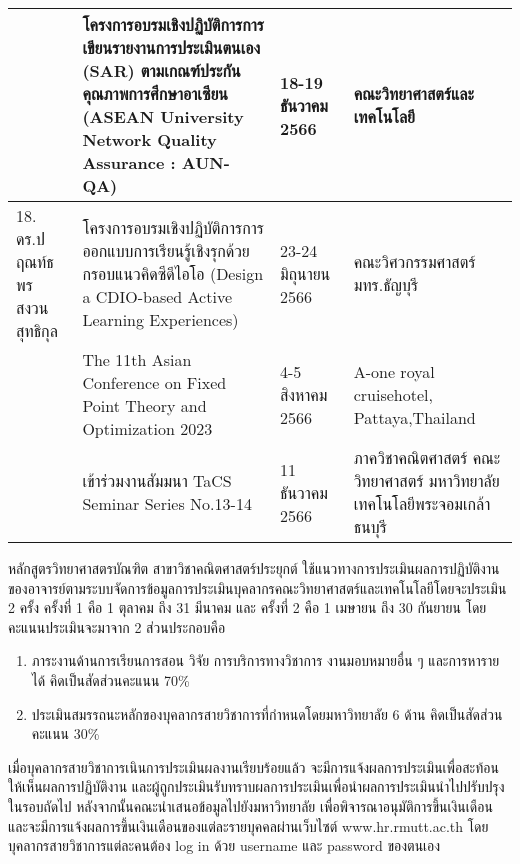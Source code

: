 \begin{longtable}{|p{}|>{\raggedright}p{}|>{\raggedright}p{}|p{}|}
\cline{2-4} 
&โครงการอบรมเชิงปฏิบัติการ\newline การเขียนรายงานการประเมินตนเอง (SAR) ตามเกณฑ์ประกันคุณภาพการศึกษาอาเซียน (ASEAN University Network Quality Assurance : AUN-QA)
&18-19 ธันวาคม 2566
&คณะวิทยาศาสตร์และเทคโนโลยี\\             
\hline
18. ดร.ปฤณท์ธพร สงวนสุทธิกุล
&โครงการอบรมเชิงปฏิบัติการการออกแบบการเรียนรู้เชิงรุกด้วยกรอบแนวคิดซีดีไอโอ (Design a CDIO-based Active Learning Experiences)	
&23-24 มิถุนายน 2566	
&คณะวิศวกรรมศาสตร์ มทร.ธัญบุรี\\
\cline{2-4} 
&The 11th Asian Conference on Fixed Point Theory and Optimization 2023	
&4-5 สิงหาคม 2566	
&A-one royal cruise\newline hotel, Pattaya,\newline Thailand\\             
\cline{2-4} 
&เข้าร่วมงานสัมมนา TaCS Seminar Series No.13-14	
&11 ธันวาคม  2566	
&ภาควิชาคณิตศาสตร์ คณะวิทยาศาสตร์ มหาวิทยาลัยเทคโนโลยีพระจอมเกล้าธนบุรี\\  
\hline    
\end{longtable}

\begin{doclist}
\end{doclist}


หลักสูตรวิทยาศาสตรบัณฑิต สาขาวิชาคณิตศาสตร์ประยุกต์ ใช้แนวทางการประเมินผลการปฏิบัติงานของอาจารย์ตามระบบจัดการข้อมูลการประเมินบุคลากรคณะวิทยาศาสตร์และเทคโนโลยีโดยจะประเมิน 2 ครั้ง ครั้งที่ 1 คือ 1 ตุลาคม ถึง 31 มีนาคม และ
ครั้งที่ 2 คือ 1 เมษายน ถึง 30 กันยายน
 โดยคะแนนประเมินจะมาจาก 2 ส่วนประกอบคือ 
\begin{enumerate}
\item ภาระงานด้านการเรียนการสอน วิจัย การบริการทางวิชาการ งานมอบหมายอื่น ๆ และการหารายได้ คิดเป็นสัดส่วนคะแนน 70\%
\item ประเมินสมรรถนะหลักของบุคลากรสายวิชาการที่กำหนดโดยมหาวิทยาลัย 6 ด้าน คิดเป็นสัดส่วนคะแนน 30\%
\end{enumerate}

เมื่อบุคลากรสายวิชาการเนินการประเมินผลงานเรียบร้อยแล้ว  จะมีการแจ้งผลการประเมินเพื่อสะท้อนให้เห็นผลการปฏิบัติงาน และผู้ถูกประเมินรับทราบผลการประเมินเพื่อนำผลการประเมินนำไปปรับปรุงในรอบถัดไป หลังจากนั้นคณะนำเสนอข้อมูลไปยังมหาวิทยาลัย เพื่อพิจารณาอนุมัติการขึ้นเงินเดือน และจะมีการแจ้งผลการขึ้นเงินเดือนของแต่ละรายบุคคลผ่านเว็บไซต์ www.hr.rmutt.ac.th โดยบุคลากรสายวิชาการแต่ละคนต้อง log in ด้วย username และ password ของตนเอง

